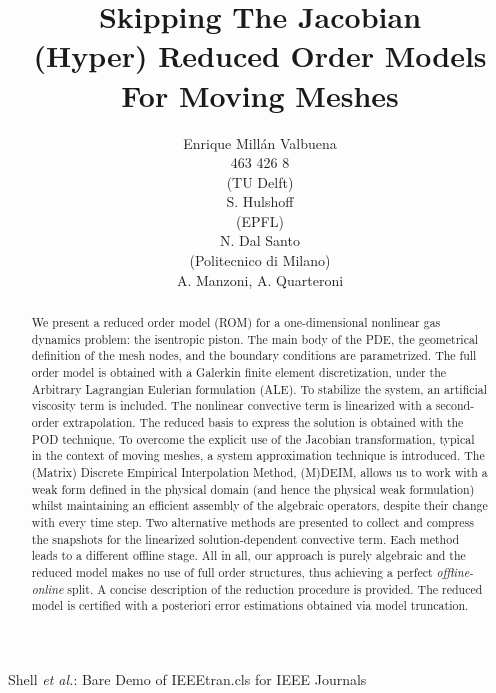 \documentclass[a4paper, technote,compsoc]{IEEEtran}
\begin{document}
\onecolumn

\title{Skipping The Jacobian \\[5mm] \large{(Hyper) Reduced Order Models For Moving Meshes}}

\author{Enrique Millán Valbuena \\ \normalsize{463 426 8}
\\[5mm]
(TU Delft) 
\\[2mm]
S. Hulshoff 
\\[5mm]
(EPFL) 
\\[2mm]
N. Dal Santo
\\[5mm]
(Politecnico di Milano) 
\\[2mm]
A. Manzoni, A. Quarteroni
}%
        
{Shell \MakeLowercase{\textit{et al.}}: Bare Demo of IEEEtran.cls for IEEE Journals}

\maketitle

\begin{abstract}
   We present a reduced order model (ROM) for a one-dimensional nonlinear gas dynamics problem:
   the isentropic piston.
   The main body of the PDE, 
   the geometrical definition of the mesh nodes, 
   and the boundary conditions are parametrized.
   The full order model is obtained with a Galerkin finite element discretization,
   under the Arbitrary Lagrangian Eulerian formulation (ALE).
   To stabilize the system, an artificial viscosity term is included.
   The nonlinear convective term is linearized with a second-order extrapolation.
   The reduced basis to express the solution is obtained with the POD technique.
   To overcome the explicit use of the Jacobian transformation, 
   typical in the context of moving meshes,
   a system approximation technique is introduced.
   The (Matrix) Discrete Empirical Interpolation Method, (M)DEIM, allows us
   to work with a weak form defined in the physical domain 
   (and hence the physical weak formulation)
   whilst maintaining an efficient assembly of the algebraic operators, 
   despite their change with every time step.
   Two alternative methods are presented to collect and compress the snapshots 
   for the linearized solution-dependent convective term.
   Each method leads to a different offline stage.
   All in all, our approach is purely algebraic
   and the reduced model makes no use of full order structures, 
   thus achieving a perfect \textit{offline-online} split.
   A concise description of the reduction procedure is provided.
   The reduced model is certified with a posteriori error estimations obtained via model truncation.
\end{abstract}
\end{document}
